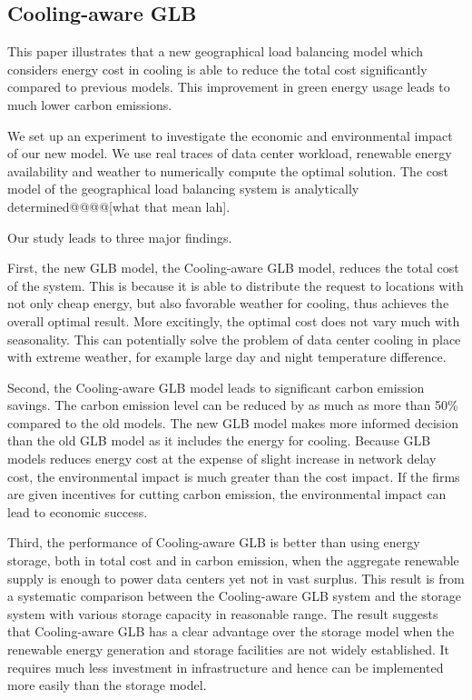 \documentclass{acm_proc_article-sp}
\begin{document}
\subsection{Cooling-aware GLB}

This paper illustrates that a new geographical load balancing model which considers energy cost in cooling is able to reduce the total cost significantly compared to previous models. This improvement in green energy usage leads to much lower carbon emissions.

We set up an experiment to investigate the economic and environmental impact of our new model. We use real traces of data center workload, renewable energy availability and weather to numerically compute the optimal solution. The cost model of the geographical load balancing system is analytically determined@@@@[what that mean lah].

Our study leads to three major findings.

First, the new GLB model, the Cooling-aware GLB model, reduces the total cost of the system. This is because it is able to distribute the request to locations with not only cheap energy, but also favorable weather for cooling, thus achieves the overall optimal result. More excitingly, the optimal cost does not vary much with seasonality. This can potentially solve the problem of data center cooling in place with extreme weather, for example large day and night temperature difference.  

Second, the Cooling-aware GLB model leads to significant carbon emission savings. The carbon emission level can be reduced by as much as more than 50\% compared to the old models. The new GLB model makes more informed decision than the old GLB model as it includes the energy for cooling. Because GLB models reduces energy cost at the expense of slight increase in network delay cost, the environmental impact is much greater than the cost impact. If the firms are given incentives for cutting carbon emission, the environmental impact can lead to economic success.  

Third, the performance of Cooling-aware GLB is better than using energy storage, both in total cost and in carbon emission, when the aggregate renewable supply is enough to power data centers yet not in vast surplus. This result is from a systematic comparison between the Cooling-aware GLB system and the storage system with various storage capacity in reasonable range. The result suggests that Cooling-aware GLB has a clear advantage over the storage model when the renewable energy generation and storage facilities are not widely established. It requires much less investment in infrastructure and hence can be implemented more easily than the storage model.
\end{document}
